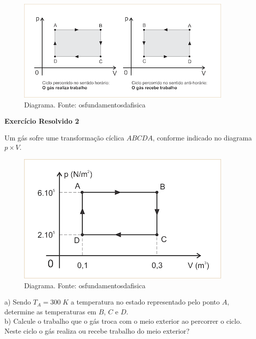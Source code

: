 \documentclass[12pt]{article}
\begin{document}
\begin{figure}[h]{}
\centering\includegraphics[width=2.5truein]{img6.png}
\caption{Diagrama. Fonte: osfundamentosdafisica}
\centering
\end{figure}

\textbf{Exercício Resolvido 2}


Um gás sofre ume transformação cíclica $ABCDA$, conforme indicado no diagrama $p\times V$.


\begin{figure}[h]{}
\centering\includegraphics[width=2.5truein]{img7.png}
\caption{Diagrama. Fonte: osfundamentosdafisica}
\centering
\end{figure}

a) Sendo $T_{A} = 300\;K$ a temperatura no estado representado pelo ponto $A$, determine as temperaturas em $B$, $C$ e $D$. \\
b) Calcule o trabalho que o gás troca com o meio exterior ao percorrer o ciclo. Neste ciclo o gás realiza ou recebe trabalho do meio exterior?
\end{document}
